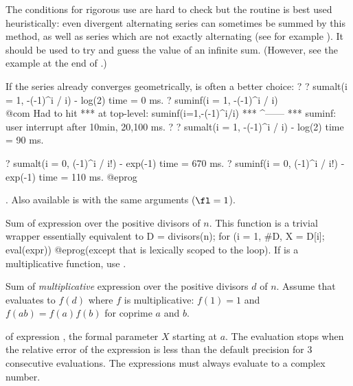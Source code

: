 The conditions for rigorous use are hard to check but the routine is best used
heuristically: even divergent alternating series can sometimes be summed by
this method, as well as series which are not exactly alternating (see for
example ). It should be used to try and guess the
value of an infinite sum. (However, see the example at the end of
.)

If the series already converges geometrically,
 is often a better choice:
\bprog
? 
? sumalt(i = 1, -(-1)^i / i)  - log(2)
time = 0 ms.
? suminf(i = 1, -(-1)^i / i)   \\@com Had to hit 
  ***   at top-level: suminf(i=1,-(-1)^i/i)
  ***                                ^------
  *** suminf: user interrupt after 10min, 20,100 ms.
? 
? sumalt(i = 1, -(-1)^i / i)  - log(2)
time = 90 ms.

? sumalt(i = 0, (-1)^i / i!) - exp(-1)
time = 670 ms.
? suminf(i = 0, (-1)^i / i!) - exp(-1)
time = 110 ms.
@eprog

. Also
available is  with the same arguments ($\fl = 1$).

\label{se:sumdiv}
Sum of expression  over the positive divisors of $n$.
This function is a trivial wrapper essentially equivalent to
\bprog
  D = divisors(n);
  for (i = 1, #D, X = D[i]; eval(expr))
@eprog\noindent (except that  is lexically scoped to the 
loop). If  is a multiplicative function, use .

\label{se:sumdivmult}
Sum of \emph{multiplicative} expression  over the positive
divisors $d$ of $n$. Assume that  evaluates to $f(d)$
where $f$ is multiplicative: $f(1) = 1$ and $f(ab) = f(a)f(b)$ for coprime
$a$ and $b$.

\label{se:suminf}
 of expression
, the formal parameter $X$ starting at $a$. The evaluation stops
when the relative error of the expression is less than the default precision
for 3 consecutive evaluations. The expressions must always evaluate to a
complex number.

